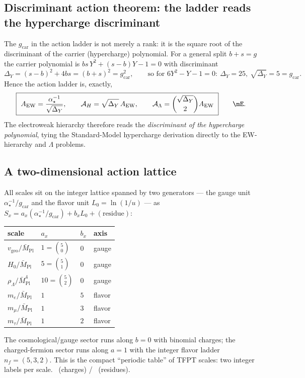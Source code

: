 \documentclass[11pt,a4paper]{article}
\newcommand{\Mbar}{\bar M_{\mathrm{Pl}}}
\newcommand{\gcar}{g_{\mathrm{car}}}
\newcommand{\useed}{u}
\newcommand{\ainv}{\alpha^{-1}_\star}
\newcommand{\AEW}{A_{\mathrm{EW}}}
\newcommand{\AL}{\mathcal A_\Lambda}
\newcommand{\AH}{\mathcal A_H}
\theoremstyle{definition}
\begin{document}
\subsection{Discriminant action theorem: the ladder reads the hypercharge discriminant}

The $\gcar$ in the action ladder is not merely a rank: it is the square root of the discriminant of
the carrier (hypercharge) polynomial. For a general split $b+s=g$ the carrier polynomial is
$bs\,Y^2+(s-b)Y-1=0$ with discriminant
\begin{equation}
  \Delta_Y=(s-b)^2+4bs=(b+s)^2=\gcar^2,\qquad\text{so for }6Y^2-Y-1=0:\ \Delta_Y=25,\ \sqrt{\Delta_Y}=5=\gcar .
\end{equation}
Hence the action ladder is, exactly,
\begin{equation}
  \boxed{\ \AEW=\frac{\ainv}{\sqrt{\Delta_Y}},\qquad \AH=\sqrt{\Delta_Y}\,\AEW,\qquad
  \AL=\binom{\sqrt{\Delta_Y}}{2}\AEW\ }\qquad\mE .
\end{equation}
The electroweak hierarchy therefore reads the \emph{discriminant of the hypercharge polynomial}, tying
the Standard-Model hypercharge derivation directly to the EW-hierarchy and $\Lambda$ problems.

\subsection{A two-dimensional action lattice}

All scales sit on the integer lattice spanned by two generators --- the gauge unit $\ainv/\gcar$ and
the flavor unit $L_0=\ln(1/\useed)$ --- as $S_x=a_x(\ainv/\gcar)+b_x L_0+(\text{residue})$:
\begin{center}\small
\begin{tabular}{@{}llll@{}}
\toprule
scale & $a_x$ & $b_x$ & axis \\
\midrule
$v_{\mathrm{geo}}/\Mbar$ & $1=\binom50$ & $0$ & gauge \\
$H_0/\Mbar$ & $5=\binom51$ & $0$ & gauge \\
$\rho_\Lambda/\Mbar^4$ & $10=\binom52$ & $0$ & gauge \\
$m_e/\Mbar$ & $1$ & $5$ & flavor \\
$m_\mu/\Mbar$ & $1$ & $3$ & flavor \\
$m_\tau/\Mbar$ & $1$ & $2$ & flavor \\
\bottomrule
\end{tabular}
\end{center}
The cosmological/gauge sector runs along $b=0$ with binomial charges; the charged-fermion sector
runs along $a=1$ with the integer flavor ladder $n_f=(5,3,2)$. This is the compact ``periodic table''
of TFPT scales: two integer labels per scale. \mE\ (charges) / \mC\ (residues).
\end{document}
